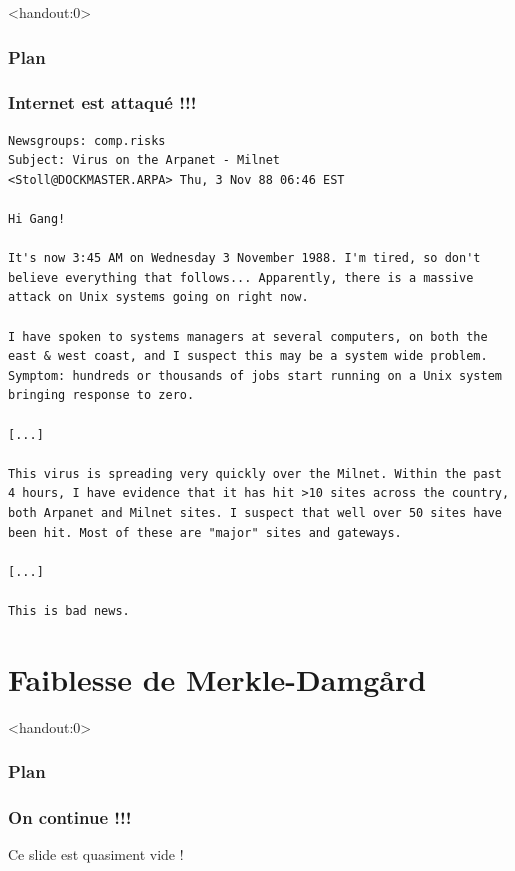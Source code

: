 \begin{frame}<handout:0>
  \frametitle{Plan}
  \tableofcontents[currentsection,subsectionstyle=hide]
\end{frame}

\begin{frame}[fragile]
  \frametitle{Internet est attaqué !!!}
\vspace{-.25em}
{\footnotesize
\begin{verbatim}
Newsgroups: comp.risks
Subject: Virus on the Arpanet - Milnet
<Stoll@DOCKMASTER.ARPA> Thu, 3 Nov 88 06:46 EST

Hi Gang!

It's now 3:45 AM on Wednesday 3 November 1988. I'm tired, so don't
believe everything that follows... Apparently, there is a massive
attack on Unix systems going on right now.

I have spoken to systems managers at several computers, on both the
east & west coast, and I suspect this may be a system wide problem.
Symptom: hundreds or thousands of jobs start running on a Unix system
bringing response to zero.

[...]

This virus is spreading very quickly over the Milnet. Within the past
4 hours, I have evidence that it has hit >10 sites across the country,
both Arpanet and Milnet sites. I suspect that well over 50 sites have
been hit. Most of these are "major" sites and gateways.

[...]

This is bad news.
\end{verbatim}}
\end{frame}


\section{Faiblesse de Merkle-Damg\r{a}rd}

\begin{frame}<handout:0>
  \frametitle{Plan}
  \tableofcontents[currentsection]
\end{frame}

\begin{frame}
  \frametitle{On continue !!!}

  \vfill
  Ce slide est quasiment vide !
  \vfill

\end{frame}


